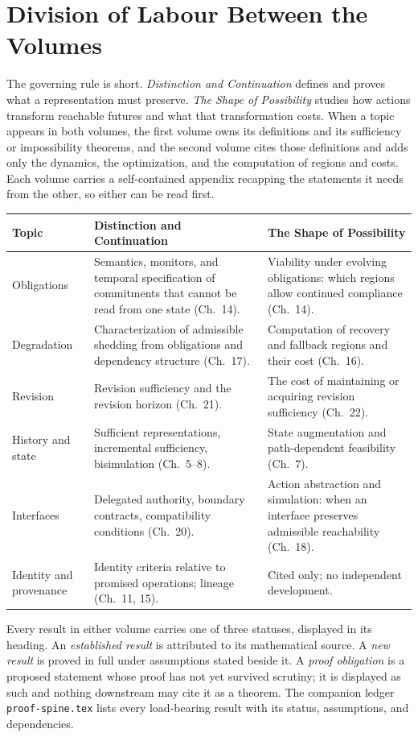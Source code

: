 
\chapter*{Division of Labour Between the Volumes}

The governing rule is short. \emph{Distinction and Continuation} defines and proves what a representation must preserve. \emph{The Shape of Possibility} studies how actions transform reachable futures and what that transformation costs. When a topic appears in both volumes, the first volume owns its definitions and its sufficiency or impossibility theorems, and the second volume cites those definitions and adds only the dynamics, the optimization, and the computation of regions and costs. Each volume carries a self-contained appendix recapping the statements it needs from the other, so either can be read first.

\begin{longtable}{@{}p{}p{}p{}@{}}
\toprule
\textbf{Topic} & \textbf{Distinction and Continuation} & \textbf{The Shape of Possibility}\\
\midrule
\endhead
Obligations & Semantics, monitors, and temporal specification of commitments that cannot be read from one state (Ch.~14). & Viability under evolving obligations: which regions allow continued compliance (Ch.~14). \\[4pt]
Degradation & Characterization of admissible shedding from obligations and dependency structure (Ch.~17). & Computation of recovery and fallback regions and their cost (Ch.~16). \\[4pt]
Revision & Revision sufficiency and the revision horizon (Ch.~21). & The cost of maintaining or acquiring revision sufficiency (Ch.~22). \\[4pt]
History and state & Sufficient representations, incremental sufficiency, bisimulation (Ch.~5--8). & State augmentation and path-dependent feasibility (Ch.~7). \\[4pt]
Interfaces & Delegated authority, boundary contracts, compatibility conditions (Ch.~20). & Action abstraction and simulation: when an interface preserves admissible reachability (Ch.~18). \\[4pt]
Identity and provenance & Identity criteria relative to promised operations; lineage (Ch.~11, 15). & Cited only; no independent development. \\
\bottomrule
\end{longtable}

Every result in either volume carries one of three statuses, displayed in its heading. An \emph{established result} is attributed to its mathematical source. A \emph{new result} is proved in full under assumptions stated beside it. A \emph{proof obligation} is a proposed statement whose proof has not yet survived scrutiny; it is displayed as such and nothing downstream may cite it as a theorem. The companion ledger \texttt{proof-spine.tex} lists every load-bearing result with its status, assumptions, and dependencies.
